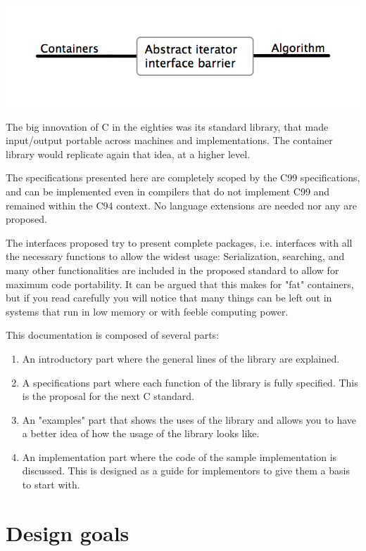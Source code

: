 \par
\includegraphics[scale=0.63]{AbstractIterator.png}
\par
The big innovation of C in the eighties was its standard library, that made input/output portable across machines and implementations. The container library would replicate again that idea, at a higher level.

The specifications presented here are completely scoped by the C99 specifications, and can be implemented even in compilers that do not implement C99 and remained within the C94 context. No language extensions are needed nor any are proposed.


The interfaces proposed try to present complete packages, i.e. interfaces with all the necessary functions to allow the widest usage: Serialization, searching, and many other functionalities are included in the proposed standard to allow for maximum code portability. It can be argued that this makes  for "fat" containers, but if you read carefully you will notice that many things can be left out in systems that run in low memory or with feeble computing power.

This documentation is composed of several parts:
\begin{enumerate}
\item An introductory part where the general lines of the library are explained.
\item A specifications part where each function of the library is fully specified. This is the proposal for the next C standard.
\item An "examples" part that shows the uses of the library and allows you to have a better idea of how the usage of the library looks like.
\item An implementation part where the code of the sample implementation is discussed. This is designed as a guide for implementors to give them a basis to start with.
\end{enumerate}
%
%
\section{Design goals}
